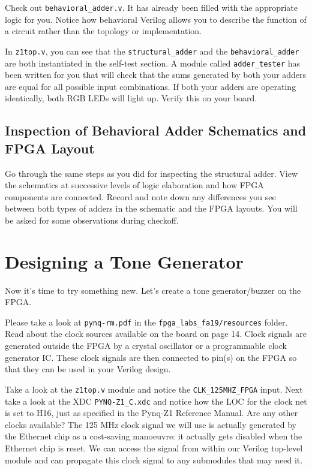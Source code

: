 \documentclass[11pt]{article}
\newcommand{\repo}{fpga\_labs\_fa19}
\begin{document}
Check out \verb|behavioral_adder.v|. It has already been filled with the appropriate logic for you. Notice how behavioral Verilog allows you to describe the function of a circuit rather than the topology or implementation.

In \verb|z1top.v|, you can see that the \verb|structural_adder| and the \verb|behavioral_adder| are both instantiated in the self-test section. A module called \verb|adder_tester| has been written for you that will check that the sums generated by both your adders are equal for all possible input combinations. If both your adders are operating identically, both RGB LEDs will light up. Verify this on your board.

\subsection{Inspection of Behavioral Adder Schematics and FPGA Layout}

Go through the same steps as you did for inspecting the structural adder. View the schematics at successive levels of logic elaboration and how FPGA components are connected. Record and note down any differences you see between both types of adders in the schematic and the FPGA layouts. You will be asked for some observations during checkoff.

\section{Designing a Tone Generator}
Now it's time to try something new. Let's create a tone generator/buzzer on the FPGA.

Please take a look at \verb|pynq-rm.pdf| in the \texttt{\repo/resources} folder.
Read about the clock sources available on the board on page 14.
Clock signals are generated outside the FPGA by a crystal oscillator or a programmable clock generator IC.
These clock signals are then connected to pin(s) on the FPGA so that they can be used in your Verilog design.

Take a look at the \verb|z1top.v| module and notice the \verb|CLK_125MHZ_FPGA| input. Next take a look at the XDC \verb|PYNQ-Z1_C.xdc| and notice how the LOC for the clock net is set to H16, just as specified in the Pynq-Z1 Reference Manual. Are any other clocks available? The 125 MHz clock signal we will use is actually generated by the Ethernet chip as a cost-saving manoeuvre: it actually gets disabled when the Ethernet chip is reset. We can access the signal from within our Verilog top-level module and can propagate this clock signal to any submodules that may need it.
\end{document}
